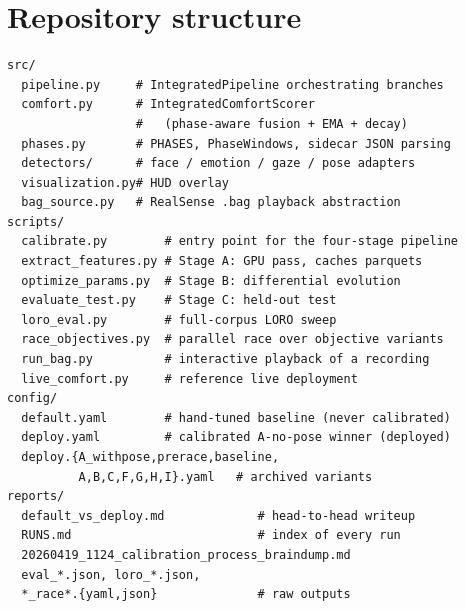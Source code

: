 \documentclass{article}
\begin{document}
\section{Repository structure}\label{app:repo}

\begin{lstlisting}
src/
  pipeline.py     # IntegratedPipeline orchestrating branches
  comfort.py      # IntegratedComfortScorer
                  #   (phase-aware fusion + EMA + decay)
  phases.py       # PHASES, PhaseWindows, sidecar JSON parsing
  detectors/      # face / emotion / gaze / pose adapters
  visualization.py# HUD overlay
  bag_source.py   # RealSense .bag playback abstraction
scripts/
  calibrate.py        # entry point for the four-stage pipeline
  extract_features.py # Stage A: GPU pass, caches parquets
  optimize_params.py  # Stage B: differential evolution
  evaluate_test.py    # Stage C: held-out test
  loro_eval.py        # full-corpus LORO sweep
  race_objectives.py  # parallel race over objective variants
  run_bag.py          # interactive playback of a recording
  live_comfort.py     # reference live deployment
config/
  default.yaml        # hand-tuned baseline (never calibrated)
  deploy.yaml         # calibrated A-no-pose winner (deployed)
  deploy.{A_withpose,prerace,baseline,
          A,B,C,F,G,H,I}.yaml   # archived variants
reports/
  default_vs_deploy.md             # head-to-head writeup
  RUNS.md                          # index of every run
  20260419_1124_calibration_process_braindump.md
  eval_*.json, loro_*.json,
  *_race*.{yaml,json}              # raw outputs
\end{lstlisting}
\end{document}
